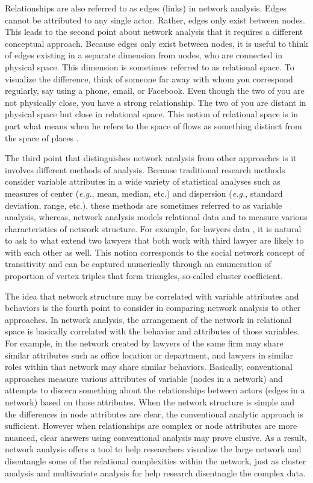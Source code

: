 \documentclass[12pt, oneside]{report}
\begin{document}
Relationships are also referred to as edges (links) in network analysis. Edges cannot be attributed to any single actor. Rather, edges only exist between nodes. This leads to the second point about network analysis that it requires a different conceptual approach. Because edges only exist between nodes, it is useful to think of edges existing in a separate dimension from nodes, who are connected in physical space. This dimension is sometimes referred to as relational space. To visualize the difference, think of someone far away with whom you correspond regularly, say using a phone, email, or Facebook. Even though the two of you are not physically close, you have a strong relationship. The two of you are distant in physical space but close in relational space. This notion of relational space is in part what means when he refers to the space of flows as something distinct from the space of places \citep{Castells}.

The third point that distinguishes network analysis from other approaches is it involves different methods of analysis. Because traditional research methods consider variable attributes in a wide variety of statistical analyses such as measures of center (\textit{e.g.}, mean, median, etc.) and dispersion (\textit{e.g.}, standard deviation, range, etc.), these methods are sometimes referred to as variable analysis, whereas, network analysis models relational data and to measure various characteristics of network structure. For example, for lawyers data \citep{Lazega}, it is natural to ask to what extend two lawyers that both work with third lawyer are likely to with each other as well. This notion corresponds to the social network concept of transitivity and can be captured numerically through an enumeration of proportion of vertex triples that form triangles, so-called cluster coefficient. 

The idea that network structure may be correlated with variable attributes and behaviors is the fourth point to consider in comparing network analysis to other approaches. In network analysis, the arrangement of the network in relational space is basically correlated with the behavior and attributes of those variables. For example, in the network created by \citet{Lazega} lawyers of the same firm may share similar attributes such as office location or department, and lawyers in similar roles within that network may share similar behaviors. Basically, conventional approaches measure various attributes of variable (nodes in a network) and attempts to discern something about the relationships between actors (edges in a network) based on those attributes. When the network structure is simple and the differences in node attributes are clear, the conventional analytic approach is sufficient. However when relationships are complex or node attributes are more nuanced, clear answers using conventional analysis may prove elusive. As a result, network analysis offers a tool to help researchers visualize the large network and disentangle some of the relational complexities within the network, just as cluster analysis and multivariate analysis for help research disentangle the complex data.
\end{document}
